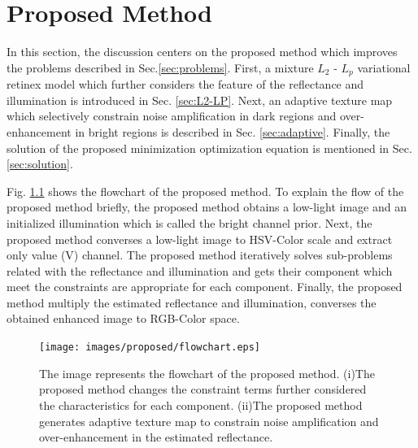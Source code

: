 \chapter{Proposed Method}
\label{sec:proposed}
In this section, the discussion centers on the proposed method which improves the problems described in Sec.\ref{sec:problems}.
First, a mixture $L_{2}$ - $L_{p}$ variational retinex model which further considers the feature of the reflectance and illumination is introduced in Sec. \ref{sec:L2-LP}. 
Next, an adaptive texture map which selectively constrain noise amplification in dark regions and over-enhancement in bright regions is described in Sec. \ref{sec:adaptive}. 
Finally, the solution of the proposed minimization optimization equation is mentioned in Sec. \ref{sec:solution}.\par
Fig. \ref{fig:proposed/flowchart} shows the flowchart of the proposed method.
To explain the flow of the proposed method briefly, the proposed method obtains a low-light image and an initialized illumination which is called the bright channel prior. Next, the proposed method converses a low-light image to HSV-Color scale and extract only value (V) channel. The proposed method iteratively solves sub-problems related with the reflectance and illumination and gets their component which meet the constraints are appropriate for each component. Finally, the proposed method multiply the estimated reflectance and illumination, converses the obtained enhanced image to RGB-Color space.

\begin{figure}[htbp]
	\centering
	\texttt{[image: images/proposed/flowchart.eps]}
	\caption{The image represents the flowchart of the proposed method. (i)The proposed method changes the constraint terms further considered the characteristics for each component. (ii)The proposed method generates adaptive texture map to constrain noise  amplification and over-enhancement in the estimated reflectance. } \label{fig:proposed/flowchart}
\end{figure}

